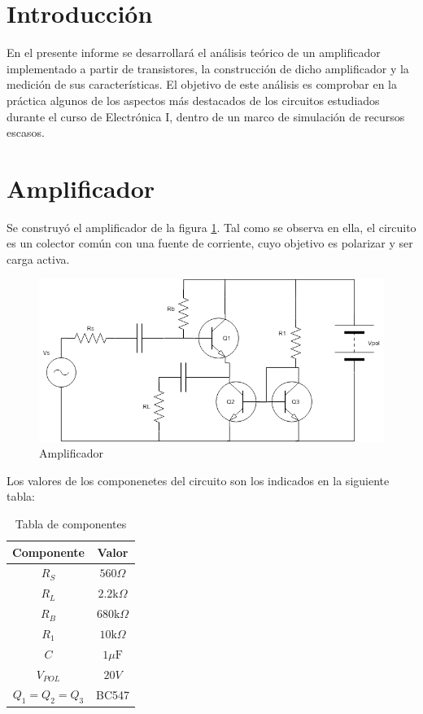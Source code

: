 \documentclass[../../main.tex]{subfiles}
\begin{document}
\section{Introducción}
En el presente informe se desarrollar\'a el análisis te\'orico de un amplificador implementado a partir de transistores, la construcción de dicho amplificador y la medición de sus características. El objetivo de este an\'alisis es comprobar en la pr\'actica algunos de los aspectos m\'as destacados de los circuitos estudiados durante el curso de Electr\'onica I, dentro de un marco de simulación de recursos escasos.

\section{Amplificador}
Se construyó el amplificador de la figura \ref{fig:cir}. Tal como se observa en ella, el circuito es un colector común con una fuente de corriente, cuyo objetivo es polarizar y ser carga activa.

\begin{figure}[H]	
	\centering
	\includegraphics[scale=0.5]{imagenes/circuito.png}
	\caption{Amplificador}\label{fig:cir}
\end{figure}

Los valores de los componenetes del circuito son los indicados en la siguiente tabla:
\begin{table}[h]
\begin{center}
\begin{tabular}{|c|c|}
\hline
Componente& Valor\\
\hline \hline
$R_S$ & $560 \Omega$  \\ \hline
$R_L$ & $2.2 \mathrm{k} \Omega$  \\ \hline
$R_B$ & $680 \mathrm{k} \Omega$  \\ \hline
$R_1$ & $10\mathrm{k}\Omega$  \\ \hline
$C$ & $1\mu \mathrm{F}$  \\ \hline
$V_{POL}$ & $20V$  \\ \hline
$Q_1 = Q_2 = Q_3$ & BC547  \\ \hline

\end{tabular}
\caption{Tabla de componentes} \label{tab:comp}
\end{center}
\end{table}
\end{document}
